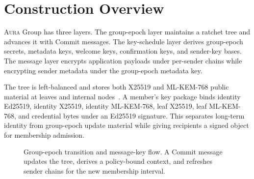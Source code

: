 \documentclass[preprint,12pt]{elsarticle}
\theoremstyle{definition}
\newcommand{\tech}[1]{\textnormal{#1}}
\newcommand{\Aura}{\textsc{Aura}}
\newcommand{\EdDSA}{\tech{Ed25519}}
\renewcommand{\DH}{\tech{X25519}}
\newcommand{\KEM}{\tech{ML-KEM-768}}
\begin{document}
\section{Construction Overview}

\Aura{} Group has three layers. The group-epoch layer maintains a ratchet tree and
advances it with Commit messages. The key-schedule layer derives group-epoch secrets,
metadata keys, welcome keys, confirmation keys, and sender-key bases. The
message layer encrypts application payloads under per-sender chains while
encrypting sender metadata under the group-epoch metadata key.

The tree is left-balanced and stores both \DH{} and \KEM{} public material at
leaves and internal nodes~\cite{rfc7748,fips203}. A member's key package binds
identity \EdDSA{},
identity \DH{}, identity \KEM{}, leaf \DH{}, leaf \KEM{}, and credential bytes
under an \EdDSA{} signature. This separates long-term identity from group-epoch
update material while giving recipients a signed object for membership
admission.

\begin{figure}[H]
\centering
{}
\caption{Group-epoch transition and message-key flow. A Commit message updates the tree,
derives a policy-bound context, and refreshes sender chains for the new
membership interval.}
\label{fig:epoch-flow}
\end{figure}
\FloatBarrier
\end{document}
